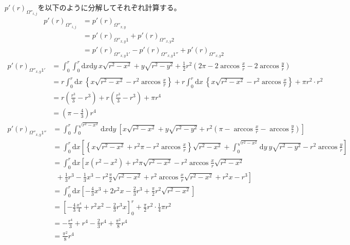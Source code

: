 $p'(r)_{\Omega''_{i,j}}$を以下のように分解してそれぞれ計算する。
\begin{align}
p'(r)_{\Omega''_{i,j}} &= p'(r)_{\Omega''_{x, y}}\nonumber \\
&= p'(r)_{\Omega''_{x, y}1}  +p'(r)_{\Omega''_{x, y}2}\nonumber \\
&= p'(r)_{\Omega''_{x, y}1'} - p'(r)_{\Omega''_{x, y}1''} + p'(r)_{\Omega''_{x, y}2}
\end{align}
\begin{align}
p'(r)_{\Omega''_{x,y}1'} &= \int^{r}_{0}\int^{r}_{0}\mathrm{d}x\mathrm{d}y\ x\sqrt{r^{2}-x^{2}} + y \sqrt{r^{2} -y^{2}} + \frac{1}{2}r^{2}\left( 2\pi -2\arccos\frac{x}{r} -2\arccos\frac{y}{r} \right) \nonumber \\
&= r\int^{r}_{0}\mathrm{d}x\ \left\{x\sqrt{r^{2}-x^{2}} - r^{2}\arccos\frac{x}{r} \right\} + r\int^{r}_{0}\mathrm{d}x\ \left\{x\sqrt{r^{2}-x^{2}} - r^{2}\arccos\frac{x}{r} \right\} + \pi r^{2}\cdot r^{2}\nonumber \\
&= r\left( \frac{r^{3}}{3} -r^{3} \right) + r\left( \frac{r^{3}}{3} -r^{3} \right) + \pi r^{4}\nonumber \\
&=  \left(\pi -\frac{4}{3}\right)r^{4}
\end{align}
\begin{align}
p'(r)_{\Omega''_{x,y}1''} &= \int^{r}_{0}\int^{\sqrt{r^{2}-x^{2}}}_{0}\mathrm{d}x\mathrm{d}y\ \left[ x\sqrt{r^{2}-x^{2}} + y \sqrt{r^{2} -y^{2}} + r^{2}\left(\pi -\arccos\frac{x}{r} -\arccos\frac{y}{r}\right) \right]\nonumber \\
&= \int^{r}_{0}\mathrm{d}x\left[ \left\{ x\sqrt{r^{2}-x^{2}} + r^{2}\pi -r^{2}\arccos\frac{x}{r} \right\}\sqrt{r^{2}-x^{2}} + \int^{\sqrt{r^{2}-x^{2}}}_{0}\mathrm{d}y\ y\sqrt{r^{2}-y^{2}} -r^{2}\arccos\frac{y}{r}\right]\nonumber \\
&= \int^{r}_{0}\mathrm{d}x\left[ x(r^{2}-x^{2}) + r^{2}\pi\sqrt{r^{2}-x^{2}} -r^{2}\arccos \frac{x}{r} \sqrt{r^{2}-x^{2}} \right. \nonumber \\
&\ \ +\left.  \frac{1}{3}r^{3} - \frac{1}{3}x^{3} - r^{2}\frac{\pi}{2}\sqrt{r^{2}-x^{2}} + r^{2}\arccos\frac{x}{r}\sqrt{r^{2}-x^{2}} +r^{2}x - r^{3}\right] \nonumber \\
&= \int^{r}_{0}\mathrm{d}x \left[-\frac{4}{3}x^{3} + 2r^{2}x - \frac{2}{3}r^{3} + \frac{\pi}{2}r^{2}\sqrt{r^{2}-x^{2}} \right]\nonumber \\
&= \left[ -\frac{4}{3}\frac{x^{4}}{4} + r^{2}x^{2} - \frac{2}{3}r^{3}x \right]^{r}_{0} + \frac{\pi}{2}r^{2}\cdot \frac{1}{4}\pi r^{2}\nonumber \\
&= -\frac{r^{4}}{3} + r^{4} -\frac{2}{3}r^{4} + \frac{\pi ^{2}}{8}r^{4}\nonumber \\
&= \frac{\pi^{2}}{8}r^{4}
\end{align}

